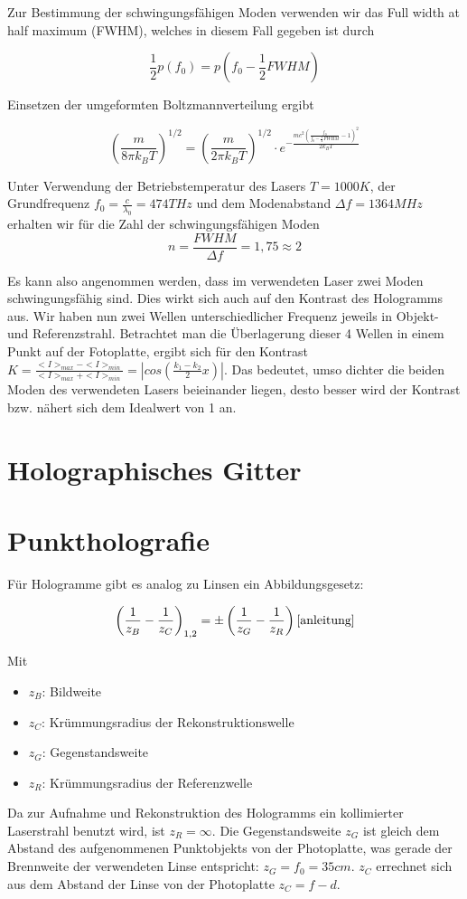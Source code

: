 \documentclass[bigchapter,colorback,accentcolor=tud4b,linedtoc,11pt]{tudreport}
\begin{document}
Zur Bestimmung der schwingungsfähigen Moden verwenden wir das Full width at half
maximum (FWHM), welches in diesem Fall gegeben ist durch 

$$\frac{1}{2}p(f_0) = p(f_0 - \frac{1}{2} FWHM) $$

Einsetzen der umgeformten Boltzmannverteilung ergibt

$$\left(\frac{m}{8\pi k_B T}\right)^{1/2} = \left(\frac{m}{2\pi k_B
    T}\right)^{1/2} \cdot e^{-\frac{m c^2\left( \frac{f_0}{f_0 -
        \frac{1}{2}FWHM}-1 \right)^2}{2k_B T}}$$

Unter Verwendung der Betriebstemperatur des Lasers $T = 1000K$, der
Grundfrequenz $f_0 = \frac{c}{\lambda_0} = 474THz$ und dem Modenabstand $\Delta
f = 1364MHz$ erhalten wir für die Zahl der schwingungsfähigen Moden
$$n = \frac{FWHM}{\Delta f} = 1,75 \approx 2$$

Es kann also angenommen werden, dass im verwendeten Laser zwei Moden
schwingungsfähig sind. Dies wirkt sich auch auf den Kontrast des Hologramms aus. Wir haben nun zwei Wellen unterschiedlicher Frequenz jeweils in Objekt- und Referenzstrahl. Betrachtet man die Überlagerung dieser 4 Wellen in einem Punkt auf der Fotoplatte, ergibt sich für den Kontrast $K = \frac{<I>_{max}-<I>_{min}}{<I>_{max}+<I>_{min}} = |cos \left( \frac{k_1-k_2}{2} x \right)|$. Das bedeutet, umso dichter die beiden Moden des verwendeten Lasers beieinander liegen, desto besser wird der Kontrast bzw. nähert sich dem Idealwert von 1 an.

\section{Holographisches Gitter}

\section{Punktholografie}

Für Hologramme gibt es analog zu Linsen ein Abbildungsgesetz:

$$\left( \frac{1}{z_B} -\frac{1}{z_C} \right)_{1,2} = \pm \left( \frac{1}{z_G}
  -\frac{1}{z_R} \right) \cite{anleitung}$$

Mit 
\begin{itemize}
  \item $z_B$: Bildweite
  \item $z_C$: Krümmungsradius der Rekonstruktionswelle
  \item $z_G$: Gegenstandsweite
  \item $z_R$: Krümmungsradius der Referenzwelle
\end{itemize}
Da zur Aufnahme und Rekonstruktion des Hologramms ein kollimierter Laserstrahl
benutzt wird, ist $z_R = \infty$. Die Gegenstandsweite $z_G$ ist gleich dem
Abstand des aufgenommenen Punktobjekts von der Photoplatte, was gerade der
Brennweite der verwendeten Linse entspricht: $z_G = f_0 = 35cm$. $z_C$ errechnet
sich aus dem Abstand der Linse von der Photoplatte $z_C = f - d$.
\end{document}
